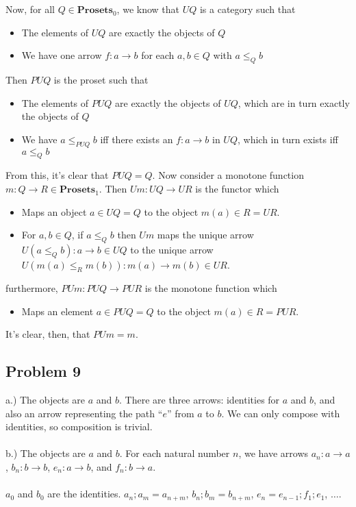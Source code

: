 \documentclass{article}
\newcommand{\mbf}{\mathbf}
\begin{document}
Now, for all $Q \in \mbf{Prosets}_0$, we know that $UQ$ is a category such that
\begin{itemize}
\item The elements of $UQ$ are exactly the objects of $Q$
\item We have one arrow $f : a \to b$ for each $a,b \in Q$ with $a \leq_Q b$
\end{itemize}
Then $PUQ$ is the proset such that
\begin{itemize}
\item The elements of $PUQ$ are exactly the objects of $UQ$, which are in turn exactly the objects of $Q$
\item We have $a \leq_{PUQ} b$ iff there exists an $f : a \to b$ in $UQ$, which in turn exists iff $a \leq_Q b$
\end{itemize}
From this, it's clear that $PUQ = Q$.
Now consider a monotone function $m : Q \to R \in \mbf{Prosets}_1$.
Then $Um : UQ \to UR$ is the functor which
\begin{itemize}
\item Maps an object $a \in UQ = Q$ to the object $m(a) \in R = UR$.
\item For $a,b \in Q$, if $a \leq_Q b$ then $Um$ maps the unique arrow $U(a \leq_Q b) : a \to b \in UQ$
      to the unique arrow $U(m(a) \leq_R m(b)) : m(a) \to m(b) \in UR$.
\end{itemize}
furthermore, $PUm : PUQ \to PUR$ is the monotone function which
\begin{itemize}
\item Maps an element $a \in PUQ = Q$ to the object $m(a) \in R = PUR$.
\end{itemize}
It's clear, then, that $PUm = m$. 

\subsection{Problem 9}

a.) The objects are $a$ and $b$. There are three arrows:
identities for $a$ and $b$, and also an arrow representing the path
``$e$'' from $a$ to $b$. We can only compose with identities, so 
composition is trivial.\\~\\

b.) The objects are $a$ and $b$. For each natural number $n$,
we have arrows $a_n : a \to a$, $b_n : b \to b$, $e_n : a \to b$,
and $f_n : b \to a$. \\~\\
$a_0$ and $b_0$ are the identities. $a_{n};a_{m} = a_{n + m}$, $b_{n};b_{m} = b_{n + m}$, $e_{n} = e_{n-1};f_1;e_1$, $\ldots$.
\end{document}
